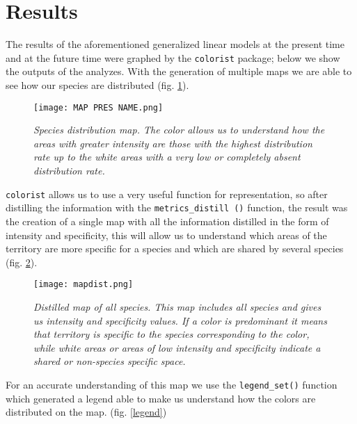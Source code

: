 \documentclass[12pt,a4paper]{article}
\begin{document}
\section{Results}
The results of the aforementioned generalized linear models at the present time and at the future time were graphed by the \texttt{colorist} package; below we show the outputs of the analyzes.
With the generation of multiple maps we are able to see how our species are distributed (fig. \ref{multiplepres}).
{\begin{figure}[H]
\centerline{\texttt{[image: MAP PRES NAME.png]}}
\caption{\textit{Species distribution map.
The color allows us to understand how the areas with greater intensity are those with the highest distribution rate up to the white areas with a very low or completely absent distribution rate.}}
\label{multiplepres}
\end{figure}} 
\vspace{1cm}
\texttt{colorist} allows us to use a very useful function for representation, so after distilling the information with the \texttt {metrics\_distill ()} function, the result was the creation of a single map with all the information distilled in the form of intensity and specificity, this will allow us to understand which areas of the territory are more specific for a species and which are shared by several species (fig. \ref{mapdist}).
\vspace{1cm}

\begin{figure}[H]
\centerline{\texttt{[image: mapdist.png]}}
\caption{\textit{Distilled map of all species.
This map includes all species and gives us intensity and specificity values.
If a color is predominant it means that territory is specific to the species corresponding to the color, while white areas or areas of low intensity and specificity indicate a shared or non-species specific space.}}
\label{mapdist}
\end{figure}

\vspace{1cm}
For an accurate understanding of this map we use the \texttt{legend\_set()} function which generated a legend able to make us understand how the colors are distributed on the map. (fig. \ref{legend})
\end{document}

